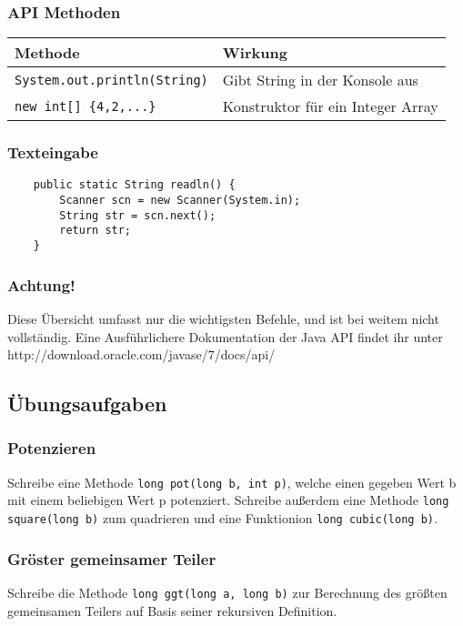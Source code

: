 		\subsubsection{API Methoden}
		\begin{tabular}{ll}
		\textbf{Methode} & \textbf{Wirkung}\\
		\hline
		\lstinline$System.out.println(String)$ & Gibt String in der Konsole aus\\
		\lstinline$new int[] {4,2,...}$ & Konstruktor für ein Integer Array\\		
		
		\end{tabular}

		\subsubsection{Texteingabe}
			\begin{lstlisting}
	public static String readln() {	
		Scanner scn = new Scanner(System.in);
		String str = scn.next();
		return str;
	}
			\end{lstlisting}

		\subsubsection{Achtung!}
			Diese Übersicht umfasst nur die wichtigsten Befehle, und ist bei weitem nicht vollständig. Eine Ausführlichere Dokumentation der Java API findet ihr unter http://download.oracle.com/javase/7/docs/api/

	\subsection{Übungsaufgaben}
		\subsubsection{Potenzieren}
			Schreibe eine Methode \lstinline$long pot(long b, int p)$, welche einen gegeben Wert b mit einem beliebigen Wert p potenziert. Schreibe außerdem eine Methode \lstinline$long square(long b)$ zum quadrieren und eine Funktionion \lstinline$long cubic(long b)$.
		\subsubsection{Gröster gemeinsamer Teiler}
			Schreibe die Methode \lstinline$long ggt(long a, long b)$ zur Berechnung des größten gemeinsamen Teilers auf Basis seiner rekursiven Definition.
